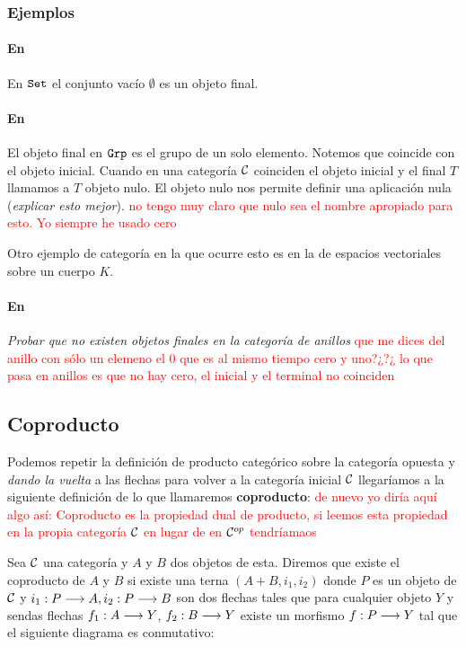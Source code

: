 \subsubsection{Ejemplos}
\paragraph{En \Set}
En $\texttt{Set}$ el conjunto vacío $\emptyset$ es un objeto final.

\paragraph{En \Grp}

El objeto final en $\texttt{Grp}$ es el grupo de un solo elemento. Notemos
que coincide con el objeto inicial. Cuando en una categoría $\mathcal{C}$ coinciden
el objeto inicial y el final $T$ llamamos a $T$ objeto nulo. El objeto
nulo nos permite definir una aplicación nula (\textit{explicar esto mejor}). \textcolor{red}{no tengo muy claro que nulo sea el nombre apropiado para esto. Yo siempre he usado cero}

Otro ejemplo de categoría en la que ocurre esto es en la de espacios vectoriales
sobre un cuerpo $K$.

\paragraph{En \Ring}
\textit{Probar que no existen objetos finales en la categoría de anillos} \textcolor{red}{que me dices del anillo con sólo un elemeno el $0$ que es al mismo tiempo cero y uno?¿?¿ lo que pasa en anillos es que no hay cero, el inicial y el terminal no coinciden}

\subsection{Coproducto}
Podemos repetir la definición de producto categórico sobre la categoría
opuesta y \textit{dando la vuelta} a las flechas para volver a la
categoría inicial $\mathcal{C}$ llegaríamos a la siguiente definición de lo que
llamaremos \textbf{coproducto}: \textcolor{red}{de nuevo yo diría aquí algo así: Coproducto es la propiedad dual de producto, si leemos esta propiedad en la propia categoría $\mathcal{C}$ en lugar de en $\mathcal{C}^{op}$ tendríamaos}

\begin{definition}
Sea $\mathcal{C}$ una categoría y $A$ y $B$ dos objetos de esta. Diremos que
existe el coproducto de $A$ y $B$
si existe una terna $(A+B, i_1, i_2)$
donde $P$ es un objeto de $\mathcal{C}$ y
$i_1 : P\longrightarrow A, i_2 : P\longrightarrow B$ son dos flechas tales
que para cualquier objeto $Y$ y sendas flechas $f_1 : A\longrightarrow Y$,
$f_2 : B\longrightarrow Y$ existe un morfismo
$f : P\longrightarrow Y$ tal que el siguiente diagrama es conmutativo:
\begin{center}
\end{center}
\end{definition}

